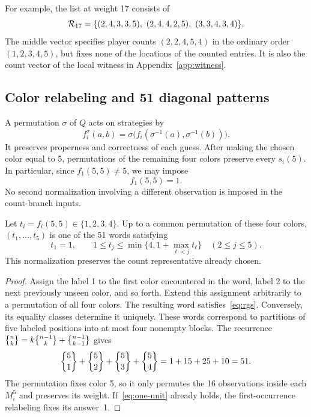 For example, the list at weight 17 consists of
\[
\calR_{17}=\{(2,4,3,3,5),\ (2,4,4,2,5),\ (3,3,4,3,4)\}.
\]
The middle vector specifies player counts $(2,2,4,5,4)$ in the ordinary
order $(1,2,3,4,5)$, but fixes none of the locations of the counted entries.
It is also the count vector of the local witness in Appendix~\ref{app:witness}.

\subsection{Color relabeling and 51 diagonal patterns}
A permutation $\sigma$ of $Q$ acts on strategies by
\begin{equation}\label{eq:color-action}
f_i^\sigma(a,b)=
\sigma\bigl(f_i(\sigma^{-1}(a),\sigma^{-1}(b))\bigr).
\end{equation}
It preserves properness and correctness of each guess. After making the
chosen color equal to 5, permutations of the remaining four colors preserve
every $s_i(5)$. In particular, since $f_1(5,5)\ne5$, we may impose
\begin{equation}\label{eq:one-unit}
f_1(5,5)=1.
\end{equation}
No second normalization involving a different observation is imposed in
the count-branch inputs.

\begin{lemma}\label{lem:patterns}
Let $t_i=f_i(5,5)\in\{1,2,3,4\}$. Up to a common permutation of these
four colors, $(t_1,\ldots,t_5)$ is one of the 51 words satisfying
\begin{equation}\label{eq:rgs}
t_1=1,\qquad
1\leq t_j\leq\min\{4,1+\max_{\ell<j}t_\ell\}\quad(2\leq j\leq5).
\end{equation}
This normalization preserves the count representative already chosen.
\end{lemma}
\begin{proof}
Assign the label 1 to the first color encountered in the word, label 2 to
the next previously unseen color, and so forth. Extend this assignment
arbitrarily to a permutation of all four colors. The resulting word
satisfies~\eqref{eq:rgs}. Conversely, its equality classes determine it
uniquely. These words correspond to partitions of five labeled positions
into at most four nonempty blocks. The recurrence
$\Stirling{n}{k}=k\Stirling{n-1}{k}+\Stirling{n-1}{k-1}$ gives
\[
\Stirling{5}{1}+\Stirling{5}{2}+\Stirling{5}{3}+\Stirling{5}{4}
=1+15+25+10=51.
\]
The permutation fixes color 5, so it only permutes the 16 observations
inside each $M_i^5$ and preserves its weight. If~\eqref{eq:one-unit}
already holds, the first-occurrence relabeling fixes its answer~1.
\end{proof}

